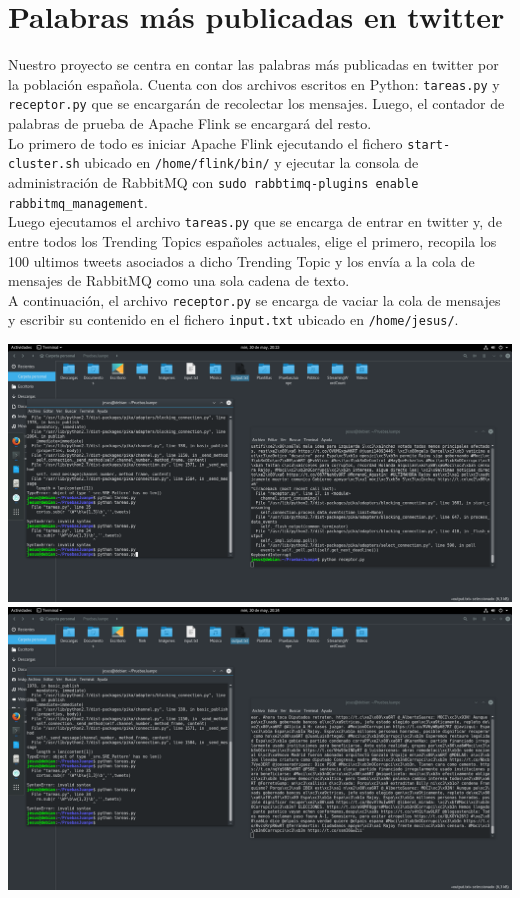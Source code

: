\documentclass[12pt,letterpaper]{article}
\begin{document}
\section{Palabras más publicadas en twitter}
Nuestro proyecto se centra en contar las palabras más publicadas en twitter por la población española. Cuenta con dos archivos escritos en Python: \texttt{tareas.py} y \texttt{receptor.py} que se encargarán de recolectar los mensajes. Luego, el contador de palabras de prueba de Apache Flink se encargará del resto.\\

Lo primero de todo es iniciar Apache Flink ejecutando el fichero \texttt{start-cluster.sh} ubicado en \texttt{/home/flink/bin/} y ejecutar la consola de administración de RabbitMQ con \texttt{sudo rabbtimq-plugins enable rabbitmq\_management}.\\

Luego ejecutamos el archivo \texttt{tareas.py} que se encarga de entrar en twitter y, de entre todos los Trending Topics españoles actuales, elige el primero, recopila los 100 ultimos tweets asociados a dicho Trending Topic y los envía a la cola de mensajes de RabbitMQ como una sola cadena de texto.\\

A continuación, el archivo \texttt{receptor.py} se encarga de vaciar la cola de mensajes y escribir su contenido en el fichero \texttt{input.txt} ubicado en \texttt{/home/jesus/}.

\begin{center}
	\includegraphics[scale=0.24]{16.png}\\
	
	\includegraphics[scale=0.24]{17.png}
\end{center}
\end{document}
